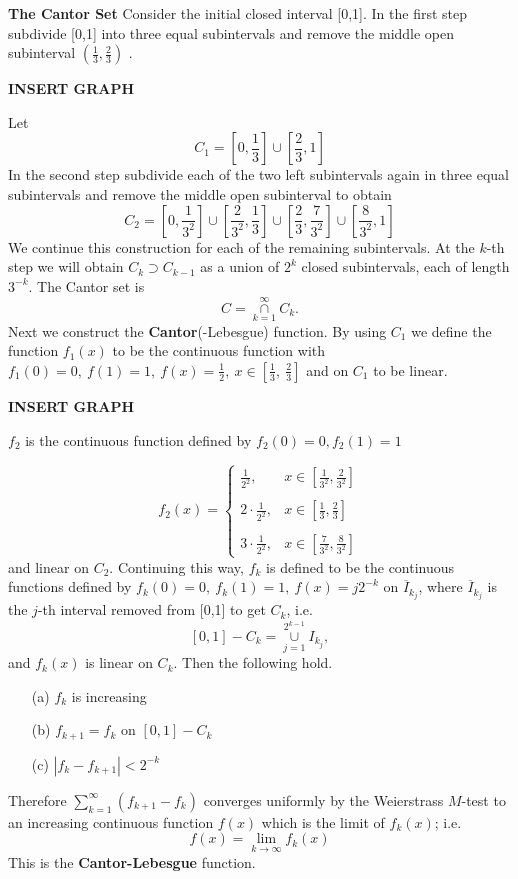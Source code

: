 \documentclass[12pt]{report}
\begin{document}
\bigskip
\noindent
{\large\bf   The Cantor Set}
\noindent Consider the initial closed interval [0,1].  In the first step
subdivide [0,1] into three equal subintervals and remove the middle open
subinterval $\left (
\frac{1}{3}, \frac{2}{3} \right )$ .

\smallskip
\noindent
\centerline{{\bf  INSERT GRAPH}}

 Let
\[ C_1 = \left  [0, \frac{1}{3} \right ] \cup \left [ \frac{2}{3}, 1 \right ]
\] In the second step subdivide each of the two left subintervals again in
three equal subintervals and remove the middle open subinterval to
obtain
\[ C_2 = \left [ 0, \frac{1}{3^2} \right ] \cup \left [ \frac{2}{3^2}, \frac{1}{3}
\right ]
\cup \left [ \frac{2}{3}, \frac{7}{3^2} \right ] \cup \left [ \frac{8}{3^2}, 1
\right ]
\] We continue this construction for each of the remaining subintervals. 
At the
$k$-th step we will obtain $C_k \supset C_{k-1}$ as a union of $2^k$ closed
subintervals, each of length $3^{-k}$.  The Cantor set is 
\[ C = \overset{\infty}{\underset{k=1}{\cap}} C_k.
\]
\noindent 
Next we construct the {\bf  Cantor}(-Lebesgue) function.  By
using $C_1$ we define the function $f_1(x)$ to be the continuous function
with $f_1(0) = 0,\  f(1) = 1,\  f(x) = \frac{1}{2}, \ x \in \left [ \frac{1}{3}, \
\frac{2}{3} \right ]$ and on $C_1$ to be linear.

\smallskip
\noindent
\centerline{{\bf  INSERT GRAPH}}

\smallskip
\noindent
$f_2$ is the continuous function defined by $f_2(0) = 0, f_2(1) = 1$

\[ f_2 (x) = \left \{ \begin{array}{ll}
\frac{1}{2^2}, &x \in \left [ \frac{1}{3^2}, \frac{2}{3^2} \right ]\\
\\ 2 \cdot \frac{1}{2^2}, &x \in \left [ \frac{1}{3}, \frac{2}{3} \right ]\\
\\ 3 \cdot \frac{1}{2^2}, &x \in \left [ \frac{7}{3^2}, \frac{8}{3^2} \right
]\end{array}
\right .
\] and linear on $C_2$.  Continuing this way, $f_k$ is defined to be the
continuous functions defined by $f_k(0) = 0, \ f_k (1) = 1, \ f(x) = j2^{-k}$
on
$\overline{I}_{k_j}$, where
$\overline{I}_{k_j}$ is the $j$-th interval removed from [0,1] to get
$C_{k}$, i.e.
\[ [0,1] - C_k = \overset{2^{k-1}}{\underset{j=1}{\cup}}I_{k_j},
\] and $f_k(x)$ is linear on $C_k$.  Then the following hold.
\begin{itemize}
\item[(a)] $f_k$ is increasing
\item[(b)] $f_{k+1} = f_k$ on $[0,1] - C_k$
\item[(c)] $|f_k - f_{k+1}| < 2^{-k}$
\end{itemize} Therefore $\sum\limits^\infty_{k=1} \left ( f_{k+1} - f_k
\right )$ converges uniformly by the Weierstrass $M$-test to an
increasing continuous function $f(x)$ which is the limit of
$f_k(x)$; i.e.
\[ f(x) = \lim_{k \to \infty} f_k(x)
\] 
This is the {\bf  Cantor-Lebesgue} function.
\end{document}
